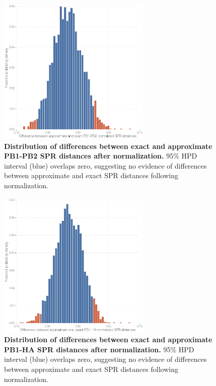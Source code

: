 \documentclass[11pt,oneside,letterpaper]{article}
\begin{document}
\begin{figure}
\centering  
\includegraphics[width=0.65\textwidth]  {supp_figures/InfB_supp_NormPB1-PB2_hist.png}
\caption{\textbf{Distribution of differences between exact and approximate PB1-PB2 SPR distances after normalization.}
95\% HPD interval (blue) overlaps zero, suggesting no evidence of differences between approximate and exact SPR distances following normalization.}
\label{NormSPR_PB1-PB2_difference}
\end{figure}


\begin{figure}
\centering  
\includegraphics[width=0.65\textwidth]  {supp_figures/InfB_supp_NormPB1-HA_hist.png}
\caption{\textbf{Distribution of differences between exact and approximate PB1-HA SPR distances after normalization.}
95\% HPD interval (blue) overlaps zero, suggesting no evidence of differences between approximate and exact SPR distances following normalization.}
\label{NormSPR_PB1-HA_difference}
\end{figure}
\end{document}
